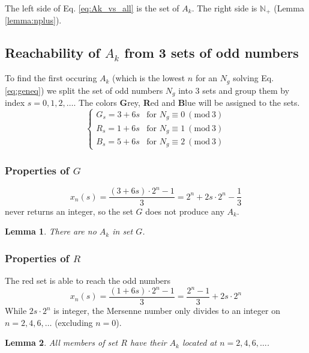 \documentclass[10pt,a4paper]{article}
\newcommand{\Mod}[1]{\ (\mathrm{mod}\ #1)}
\newtheorem{lemma}{Lemma}
\begin{document}
The left side of Eq. \ref{eq:Ak_vs_all} is the set of $A_k$.
The right side is $\mathbb{N}_+$ (Lemma \ref{lemma:nplus}).

\subsection{Reachability of $A_k$ from 3 sets of odd numbers}
To find the first occuring $A_k$ (which is the lowest $n$ for an $N_g$ solving Eq. \ref{eq:geneq}) we split the set of odd numbers $N_g$ into 3 sets and group them by index $s=0,1,2,\ldots$. The colors {\bf G}rey, {\bf R}ed and {\bf B}lue will be assigned to the sets.
\begin{equation}
 \begin{cases}
	 G_s = 3 + 6s & \text{for } N_g \equiv 0 \Mod{3} \\
	 R_s = 1 + 6s & \text{for } N_g \equiv 1 \Mod{3} \\
	 B_s = 5 + 6s & \text{for } N_g \equiv 2 \Mod{3}
 \end{cases}
\label{eq:color_cases}
\end{equation}
\subsubsection{Properties of $G$}
\begin{equation}
	x_n(s)=\frac{(3+6s)\cdot2^n - 1}{3} = 2^n + 2s\cdot 2^{n} - \frac{1}{3}
\end{equation}
never returns an integer, so the set $G$ does not produce any $A_k$.
\begin{lemma}
There are no $A_k$ in set $G$.
\label{lemma:AkofG}
\end{lemma}

\subsubsection{Properties of $R$}
The red set is able to reach the odd numbers
\begin{equation}
	x_n(s)=\frac{(1+6s)\cdot2^n - 1}{3} = \frac{2^n - 1}{3} + 2s\cdot 2^n
\label{eq:red_x_n}
\end{equation}
While $2s\cdot 2^n$ is integer, the Mersenne number only divides to an integer on $n=2,4,6,\ldots$ (excluding $n=0$).
\begin{lemma}
All members of set $R$ have their $A_k$ located at $n=2,4,6,\ldots$.
\label{lemma:AkofR}
\end{lemma}
\end{document}
